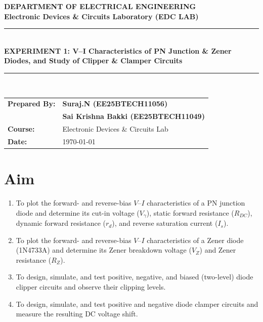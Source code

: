 \documentclass[11pt,a4paper]{article}
\begin{document}
\begin{center}
    {\LARGE \textbf{\color{primary} DEPARTMENT OF ELECTRICAL ENGINEERING}}\\[0.2cm]
    {\large \textbf{Electronic Devices \& Circuits Laboratory (EDC LAB)}}\\[0.5cm]
    \rule{\linewidth}{1pt}\\[0.4cm]
    {\Large \textbf{EXPERIMENT 1: V--I Characteristics of PN Junction \& Zener Diodes, and Study of Clipper \& Clamper Circuits}}\\[0.4cm]
    \rule{\linewidth}{1pt}\\[0.6cm]
    
    \begin{tabular}{ll}
      \textbf{Prepared By:} & \textbf{Suraj.N (EE25BTECH11056)} \\
                            & \textbf{Sai Krishna Bakki (EE25BTECH11049)} \\
        \textbf{Course:} & Electronic Devices \& Circuits Lab \\
        \textbf{Date:} & \today
    \end{tabular}
\end{center}
\vspace{0.5cm}
\section{Aim}
\begin{enumerate}
    \item To plot the forward- and reverse-bias $V$--$I$ characteristics of a PN junction diode and determine its cut-in voltage (\textbf{$V_\gamma$}), static forward resistance (\textbf{$R_{DC}$}), dynamic forward resistance (\textbf{$r_d$}), and reverse saturation current (\textbf{$I_s$}).
    \item To plot the forward- and reverse-bias $V$--$I$ characteristics of a Zener diode (1N4733A) and determine its Zener breakdown voltage (\textbf{$V_Z$}) and Zener resistance (\textbf{$R_Z$}).
    \item To design, simulate, and test positive, negative, and biased (two-level) diode clipper circuits and observe their clipping levels.
    \item To design, simulate, and test positive and negative diode clamper circuits and measure the resulting DC voltage shift.
\end{enumerate}
\end{document}
